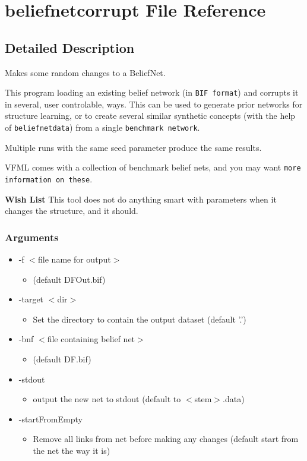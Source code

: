 \section{beliefnetcorrupt File Reference}
\label{beliefnetcorrupt}


\subsection{Detailed Description}
Makes some random changes to a Belief\-Net. 

This program loading an existing belief network (in {\tt BIF format}) and corrupts it in several, user controlable, ways. This can be used to generate prior networks for structure learning, or to create several similar synthetic concepts (with the help of {\tt beliefnetdata}) from a single {\tt benchmark network}.

Multiple runs with the same seed parameter produce the same results.

VFML comes with a collection of benchmark belief nets, and you may want {\tt more information on these}.

\begin{Desc}
\item[{\bf Wish List}]This tool does not do anything smart with parameters when it changes the structure, and it should. \end{Desc}
\subsubsection*{Arguments}

\begin{itemize}
\item -f $<$file name for output$>$\begin{itemize}
\item (default DFOut.bif)\end{itemize}
\item -target $<$dir$>$\begin{itemize}
\item Set the directory to contain the output dataset (default '.')\end{itemize}
\item -bnf $<$file containing belief net$>$\begin{itemize}
\item (default DF.bif)\end{itemize}
\item -stdout\begin{itemize}
\item output the new net to stdout (default to $<$stem$>$.data)\end{itemize}
\item -start\-From\-Empty\begin{itemize}
\item Remove all links from net before making any changes (default start from the net the way it is)\end{itemize}
\end{itemize}


